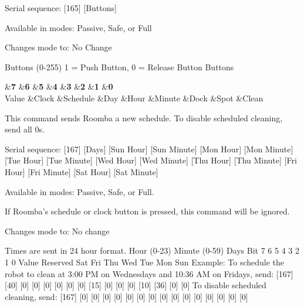 \begin{Desc}
\begin{description}
\begin{DoxyItemize}
\item Serial sequence\+: \mbox{[}165\mbox{]} \mbox{[}Buttons\mbox{]}
\item Available in modes\+: Passive, Safe, or Full
\item Changes mode to\+: No Change
\item Buttons (0-\/255) 1 = Push Button, 0 = Release Button Buttons \begin{TabularC}{9}
\hline
{}&{\bf 7 }&{\bf 6 }&{\bf 5 }&{\bf 4 }&{\bf 3 }&{\bf 2 }&{\bf 1 }&{\bf 0  }\\
Value &Clock &Schedule &Day &Hour &Minute &Dock &Spot &Clean \\
\end{TabularC}

\end{DoxyItemize}\item[{\em 
\hypertarget{group__roomba-lib_gga305e17dfb7050ad83ea49ded2e6a2e24ac4b9ca54bc982f8b9b565c72cb642ccc}{}R\+O\+O\+M\+B\+A\+\_\+\+S\+C\+H\+E\+D\+U\+L\+E\label{group__roomba-lib_gga305e17dfb7050ad83ea49ded2e6a2e24ac4b9ca54bc982f8b9b565c72cb642ccc}
}]This command sends Roomba a new schedule. To disable scheduled cleaning, send all 0s.
\begin{DoxyItemize}
\item Serial sequence\+: \mbox{[}167\mbox{]} \mbox{[}Days\mbox{]} \mbox{[}Sun Hour\mbox{]} \mbox{[}Sun Minute\mbox{]} \mbox{[}Mon Hour\mbox{]} \mbox{[}Mon Minute\mbox{]} \mbox{[}Tue Hour\mbox{]} \mbox{[}Tue Minute\mbox{]} \mbox{[}Wed Hour\mbox{]} \mbox{[}Wed Minute\mbox{]} \mbox{[}Thu Hour\mbox{]} \mbox{[}Thu Minute\mbox{]} \mbox{[}Fri Hour\mbox{]} \mbox{[}Fri Minute\mbox{]} \mbox{[}Sat Hour\mbox{]} \mbox{[}Sat Minute\mbox{]}
\item Available in modes\+: Passive, Safe, or Full.
\item If Roomba’s schedule or clock button is pressed, this command will be ignored.
\item Changes mode to\+: No change
\item Times are sent in 24 hour format. Hour (0-\/23) Minute (0-\/59) Days Bit 7 6 5 4 3 2 1 0 Value Reserved Sat Fri Thu Wed Tue Mon Sun Example\+: To schedule the robot to clean at 3\+:00 P\+M on Wednesdays and 10\+:36 A\+M on Fridays, send\+: \mbox{[}167\mbox{]} \mbox{[}40\mbox{]} \mbox{[}0\mbox{]} \mbox{[}0\mbox{]} \mbox{[}0\mbox{]} \mbox{[}0\mbox{]} \mbox{[}0\mbox{]} \mbox{[}0\mbox{]} \mbox{[}15\mbox{]} \mbox{[}0\mbox{]} \mbox{[}0\mbox{]} \mbox{[}0\mbox{]} \mbox{[}10\mbox{]} \mbox{[}36\mbox{]} \mbox{[}0\mbox{]} \mbox{[}0\mbox{]} To disable scheduled cleaning, send\+: \mbox{[}167\mbox{]} \mbox{[}0\mbox{]} \mbox{[}0\mbox{]} \mbox{[}0\mbox{]} \mbox{[}0\mbox{]} \mbox{[}0\mbox{]} \mbox{[}0\mbox{]} \mbox{[}0\mbox{]} \mbox{[}0\mbox{]} \mbox{[}0\mbox{]} \mbox{[}0\mbox{]} \mbox{[}0\mbox{]} \mbox{[}0\mbox{]} \mbox{[}0\mbox{]} \mbox{[}0\mbox{]} \mbox{[}0\mbox{]} 

\end{DoxyItemize}
\end{description}
\end{Desc}
